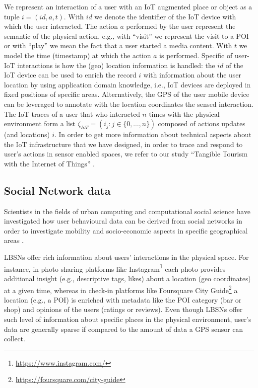 We represent an interaction of a user with an IoT augmented place or object as a tuple $i=(id, a, t)$. With $id$ we denote the identifier of the IoT device with which the user interacted. The action $a$ performed by the user represent the semantic of the physical action, e.g., with ``visit'' we represent the visit to a POI or with ``play'' we mean the fact that a user started a media content. With $t$ we model the time (timestamp) at which the action $a$ is performed. 
Specific of user-IoT interactions is how the (geo) location information is handled: the $id$ of the IoT device can be used to enrich the record $i$ with information about the user location by using application domain knowledge, i.e., IoT devices are deployed in fixed positions of specific areas. Alternatively, the GPS of the user mobile device can be leveraged to annotate with the location coordinates the sensed interaction. The IoT traces of a user that who interacted $n$ times with the physical environment form a list 
$\zeta_{IoT} = (i_j : j \in \{ 0, \dots, n\})$ 
composed of actions updates (and locations) $i$.
In order to get more information about technical aspects about the IoT infrastructure that we have designed, in order to trace and respond to user's actions in sensor enabled spaces, we refer to our study ``Tangible Tourism with the Internet of Things'' \cite{massimo:enter2018}. 

\subsection{Social Network data}
Scientists in the fields of urban computing and computational social science have investigated how user behavioural data can be derived from social networks in order to investigate mobility and socio-economic aspects in specific geographical areas \cite{urban_computing:2014, urban_computing:LBSN:2019,eating_habits:lbsn:2014}.

LBSNs 
offer rich information about users' interactions in the physical space. For instance, in photo sharing platforms like Instagram\footnote{\url{https://www.instagram.com/}} each photo provides additional insight (e.g., descriptive tags, likes) about a location (geo coordinates) at a given time,
whereas in check-in platforms like Foursquare City Guide\footnote{\url{https://foursquare.com/city-guide}} a location (e.g., a POI)
is enriched with metadata like the POI category (bar or shop) and opinions of the users (ratings or reviews).
Even though LBSNs offer such level of information about specific places in the physical environment, user's data are generally sparse if compared to the amount of data a GPS sensor can collect. %

